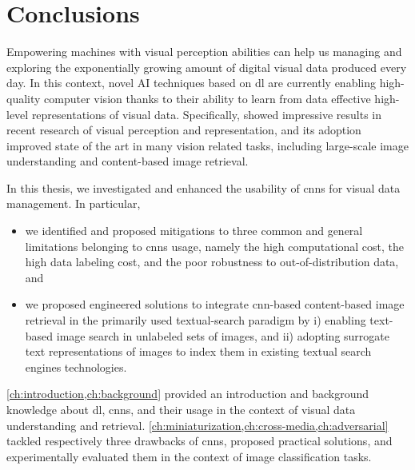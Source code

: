 
\chapter{Conclusions}
\label{ch:conclusion}

Empowering machines with visual perception abilities can help us managing and exploring the exponentially growing amount of digital visual data produced every day.
In this context, novel AI techniques based on \acrlong{dl} are currently enabling high-quality computer vision thanks to their ability to learn from data effective high-level representations of visual data.
Specifically,  showed impressive results in recent research of visual perception and representation, and its adoption improved state of the art in many vision related tasks, including large-scale image understanding and content-based image retrieval.

In this thesis, we investigated and enhanced the usability of \glspl{cnn} for visual data management.
In particular,
\begin{itemize}
    \item we identified and proposed mitigations to three common and general limitations belonging to \glspl{cnn} usage, namely the high computational cost, the high data labeling cost, and the poor robustness to out-of-distribution data, and
    \item we proposed engineered solutions to integrate \gls{cnn}-based content-based image retrieval in the primarily used textual-search paradigm by %
i) enabling text-based image search in unlabeled sets of images, and %
ii) adopting surrogate text representations of images to index them in existing textual search engines technologies.
\end{itemize}

\ref{ch:introduction,ch:background} provided an introduction and background knowledge about \acrlong{dl}, \glspl{cnn}, and their usage in the context of visual data understanding and retrieval.
\ref{ch:miniaturization,ch:cross-media,ch:adversarial} tackled respectively three drawbacks of \glspl{cnn}, proposed practical solutions, and experimentally evaluated them in the context of image classification tasks.

